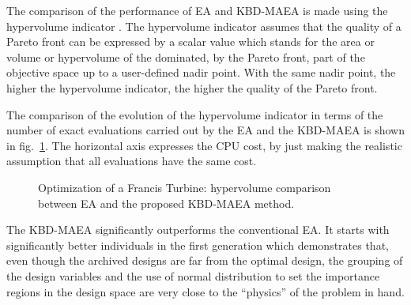 The comparison of the performance of EA and KBD-MAEA is made using the hypervolume indicator \cite{Zitz2007}. The hypervolume indicator assumes that the quality of a Pareto front can be expressed by a scalar value which stands for the area or volume or hypervolume of the dominated, by the Pareto front, part of the objective space up to a user-defined nadir point. With the same nadir point, the higher the hypervolume indicator, the higher the quality of the Pareto front.

The comparison of the evolution of the hypervolume indicator in terms of the number of exact evaluations carried out by the EA and the KBD-MAEA is shown in fig.\ \ref{Francis-Res}. The horizontal axis expresses the CPU cost, by just making the realistic assumption that all evaluations have the same cost. 

\begin{figure}[h!]
\begin{minipage}[b]{1\linewidth}
 \centering
\end{minipage}
\caption{Optimization of a Francis Turbine: hypervolume comparison between EA and the proposed KBD-MAEA method.}
\label{Francis-Res}
\end{figure}

The KBD-MAEA significantly outperforms the conventional EA. It starts with significantly better individuals in the first generation which demonstrates that, even though the archived designs are far from the optimal design, the grouping of the design variables and the use of normal distribution to set the importance regions in the design space are very close to the  ``physics'' of the problem in hand.    

